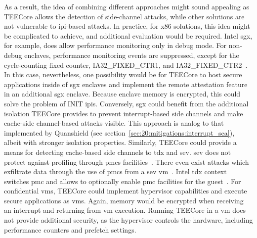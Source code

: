 As a result, the idea of combining different approaches might sound appealing as
TEECore allows the detection of side-channel attacks, while other solutions are
not vulnerable to \gls{ipi}-based attacks. In practice, for x86 solutions, this
idea might be complicated to achieve, and additional evaluation would be
required. Intel \gls{sgx}, for example, does allow performance monitoring only
in debug mode. For non-debug enclaves, performance monitoring events are
suppressed, except for the cycle-counting fixed counter, IA32\_FIXED\_CTR1, and
IA32\_FIXED\_CTR2~\cite{intel_sdm}. In this case, nevertheless, one possibility
would be for TEECore to host secure applications inside of \gls{sgx} enclaves
and implement the remote attestation feature in an additional \gls{sgx} enclave.
Because enclave memory is encrypted, this could solve the problem of INIT
\glspl{ipi}. Conversely, \gls{sgx} could benefit from the additional isolation
TEECore provides to prevent interrupt-based side channels and make cache-side
channel-based attacks visible. This approach is analog to that implemented by
Quanshield (see section~\ref{sec:20:mitigations:interrupt_sca}), albeit with
stronger isolation properties. Similarly, TEECore could provide a means for
detecting cache-based side channels to \gls{tdx} and \gls{sev}. \gls{sev} does
not protect against profiling through \glspl{pmc}
facilities~\cite{kaplan_amd_2020}. There even exist attacks which exfiltrate
data through the use of \glspl{pmc} from a \gls{sev}
\gls{vm}~\cite{CounterSEVeillance}. Intel \gls{tdx} context switches \gls{pmc}
and allows to optionally enable \gls{pmc} facilities for the
guest~\cite{tdx_whitepaper}. For confidential \glspl{vm}, TEECore could
implement hypervisor capabilities and execute secure applications as \glspl{vm}.
Again, memory would be encrypted when receiving an interrupt and returning from
\gls{vm} execution. Running TEECore in a \gls{vm} does not provide additional
security, as the hypervisor controls the hardware, including performance
counters and prefetch settings.\\


